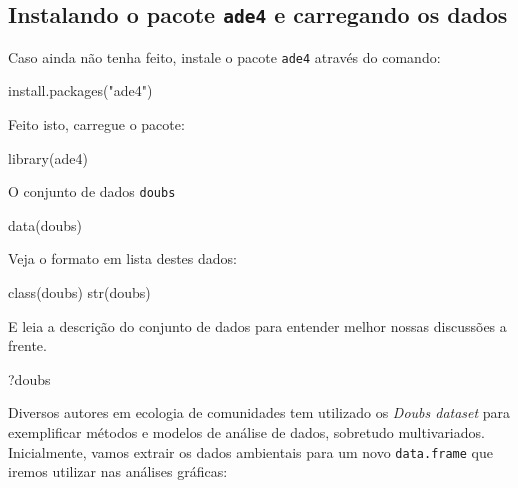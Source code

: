 \documentclass[
]{book}
\newenvironment{Shaded}{\begin{snugshade}}{\end{snugshade}}
\newcommand{\FunctionTok}[1]{\textcolor[rgb]{0.00,0.00,0.00}{#1}}
\newcommand{\NormalTok}[1]{#1}
\newcommand{\StringTok}[1]{\textcolor[rgb]{0.31,0.60,0.02}{#1}}
\begin{document}
\hypertarget{instalando-o-pacote-ade4-e-carregando-os-dados}{%
\subsection{\texorpdfstring{Instalando o pacote \texttt{ade4} e carregando os dados}{Instalando o pacote ade4 e carregando os dados}}\label{instalando-o-pacote-ade4-e-carregando-os-dados}}

Caso ainda não tenha feito, instale o pacote \texttt{ade4} através do comando:

\begin{Shaded}
\begin{Highlighting}[]
\FunctionTok{install.packages}\NormalTok{(}\StringTok{"ade4"}\NormalTok{)}
\end{Highlighting}
\end{Shaded}

Feito isto, carregue o pacote:

\begin{Shaded}
\begin{Highlighting}[]
\FunctionTok{library}\NormalTok{(ade4)}
\end{Highlighting}
\end{Shaded}

O conjunto de dados \texttt{doubs}

\begin{Shaded}
\begin{Highlighting}[]
\FunctionTok{data}\NormalTok{(doubs)}
\end{Highlighting}
\end{Shaded}

Veja o formato em lista destes dados:

\begin{Shaded}
\begin{Highlighting}[]
\FunctionTok{class}\NormalTok{(doubs)}
\FunctionTok{str}\NormalTok{(doubs)}
\end{Highlighting}
\end{Shaded}

E leia a descrição do conjunto de dados para entender melhor nossas discussões a frente.

\begin{Shaded}
\begin{Highlighting}[]
\NormalTok{?doubs}
\end{Highlighting}
\end{Shaded}

Diversos autores em ecologia de comunidades tem utilizado os \emph{Doubs dataset} para exemplificar métodos e modelos de análise de dados, sobretudo multivariados. Inicialmente, vamos extrair os dados ambientais para um novo \texttt{data.frame} que iremos utilizar nas análises gráficas:
\end{document}
